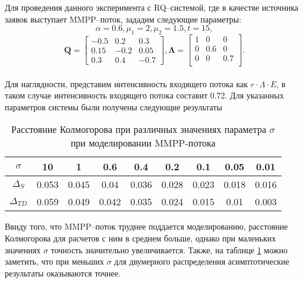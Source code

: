 Для проведения данного эксперимента с RQ--системой, где в качестве источника заявок выступает MMPP--поток, зададим следующие параметры:
\begin{equation*} \label{map_summary_input_params}
	\alpha = 0.6,
	\mu_{1} = 2,
	\mu_{2} = 1.5, 
	t = 15,
\end{equation*}
 \begin{equation*}
 	\boldsymbol{Q}=\begin{bmatrix}
 		-0.5 &  0.2 &  0.3\\
 		0.15 & -0.2 &  0.05\\
 		0.3 &  0.4 &  -0.7
 	\end{bmatrix},
 	\boldsymbol{\Lambda}=\begin{bmatrix}
 		1 &	0 & 0\\
 		0 &	0.6 & 0\\
 		0 &	0 & 0.7\\
 	\end{bmatrix}.
 \end{equation*}
\\
Для наглядности, представим интенсивность входящего потока как $r\cdot\Lambda\cdot E$, в таком случае интенсивность входящего потока составит 0.72. Для указанных параметров системы были получены следующие результаты
\begin{table}[h!] 
	\centering
	\caption{Расстояние Колмогорова при различных значениях параметра $\sigma$ при моделировании MMPP-потока}
	\label{table_map_summary}
	\begin{tabular}{| c | c | c | c | c | c | c | c | c |}
		\hline
		$\sigma$ & 10 & 1 & 0.6 & 0.4 & 0.2 & 0.1 & 0.05 & 0.01 \\ 
		\hline
		$\Delta_S$ & 0.053 & 0.045 & 0.04 & 0.036 & 0.028 & 0.023 & 0.018 & 0.016\\
		\hline
		$\Delta_{TD}$ & 0.059 & 0.049 & 0.042 & 0.035 & 0.024 & 0.015 & 0.01 & 0.003\\
		\hline
	\end{tabular}
\end{table}

Ввиду того, что MMPP--поток труднее поддается моделированию, расстояние Колмогорова для расчетов с ним в среднем больше, однако при маленьких значениях $\sigma$ точность значительно увеличивается. Также, на таблице \ref{table_map_summary} можно заметить, что при меньших $\sigma$ для двумерного распределения асимптотические результаты оказываются точнее.

